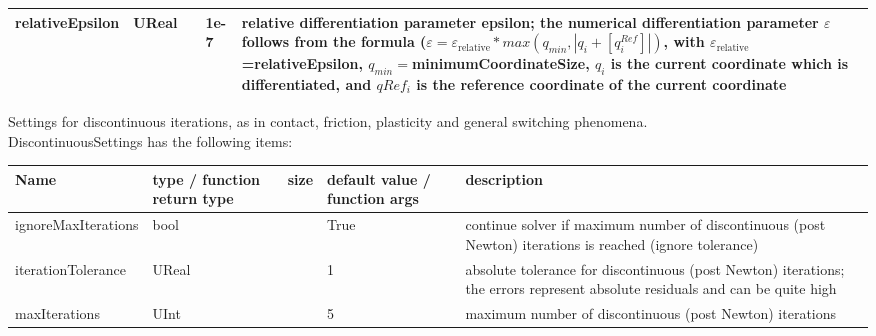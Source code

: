 \begin{center}
\begin{longtable}{| p{4.2cm} | p{2.5cm} | p{0.3cm} | p{3.0cm} | p{6cm} |}
    relativeEpsilon &     UReal &      &     1e-7 &     relative differentiation parameter epsilon; the numerical differentiation parameter $\varepsilon$ follows from the formula ($\varepsilon = \varepsilon_\mathrm{relative}*max(q_{min}, |q_i + [q^{Ref}_i]|)$, with $\varepsilon_\mathrm{relative}$=relativeEpsilon, $q_{min} = $minimumCoordinateSize, $q_i$ is the current coordinate which is differentiated, and $qRef_i$ is the reference coordinate of the current coordinate\\ \hline
	  \end{longtable}
	\end{center}

 \label{sec:DiscontinuousSettings}
Settings for discontinuous iterations, as in contact, friction, plasticity and general switching phenomena.\\ 
%
DiscontinuousSettings has the following items:
\begin{center}
  \footnotesize
  \begin{longtable}{| p{4.2cm} | p{2.5cm} | p{0.3cm} | p{3.0cm} | p{6cm} |}
    \hline
    \bf Name & \bf type / function return type & \bf size & \bf default value / function args & \bf description \\ \hline
    ignoreMaxIterations &     bool &      &     True &     continue solver if maximum number of discontinuous (post Newton) iterations is reached (ignore tolerance)\\ \hline
    iterationTolerance &     UReal &      &     1 &     absolute tolerance for discontinuous (post Newton) iterations; the errors represent absolute residuals and can be quite high\\ \hline
    maxIterations &     UInt &      &     5 &     maximum number of discontinuous (post Newton) iterations\\ \hline
	  \end{longtable}
	\end{center}

